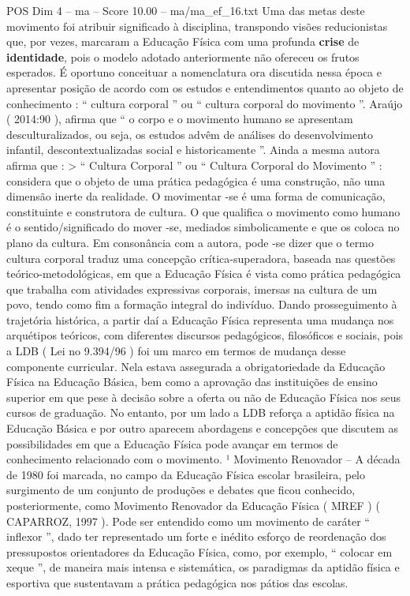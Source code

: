 \begin{textsample}{POS Dim 4 – ma – Score 10.00 – ma/ma\_ef\_16.txt}
Uma das metas deste movimento foi atribuir significado à disciplina, transpondo visões reducionistas que, por vezes, marcaram a Educação Física com uma profunda \textbf{crise} de \textbf{identidade}, pois o modelo adotado anteriormente não ofereceu os frutos esperados.
É oportuno conceituar a nomenclatura ora discutida nessa época e apresentar posição de acordo com os estudos e entendimentos quanto ao objeto de conhecimento : “ cultura corporal ” ou “ cultura corporal do movimento ”.
Araújo ( 2014:90 ), afirma que “ o corpo e o movimento humano se apresentam desculturalizados, ou seja, os estudos advêm de análises do desenvolvimento infantil, descontextualizadas social e historicamente ”.
Ainda a mesma autora afirma que : > “ Cultura Corporal ” ou “ Cultura Corporal do Movimento ” : considera que o objeto de uma prática pedagógica é uma construção, não uma dimensão inerte da realidade.
O movimentar -se é uma forma de comunicação, constituinte e construtora de cultura.
O que qualifica o movimento como humano é o sentido/significado do mover -se, mediados simbolicamente e que os coloca no plano da cultura.
Em consonância com a autora, pode -se dizer que o termo cultura corporal traduz uma concepção crítica-superadora, baseada nas questões teórico-metodológicas, em que a Educação Física é vista como prática pedagógica que trabalha com atividades expressivas corporais, imersas na cultura de um povo, tendo como fim a formação integral do indivíduo.
Dando prosseguimento à trajetória histórica, a partir daí a Educação Física representa uma mudança nos arquétipos teóricos, com diferentes discursos pedagógicos, filosóficos e sociais, pois a LDB ( Lei no 9.394/96 ) foi um marco em termos de mudança desse componente curricular.
Nela estava assegurada a obrigatoriedade da Educação Física na Educação Básica, bem como a aprovação das instituições de ensino superior em que pese à decisão sobre a oferta ou não de Educação Física nos seus cursos de graduação.
No entanto, por um lado a LDB reforça a aptidão física na Educação Básica e por outro aparecem abordagens e concepções que discutem as possibilidades em que a Educação Física pode avançar em termos de conhecimento relacionado com o movimento. ¹ Movimento Renovador – A década de 1980 foi marcada, no campo da Educação Física escolar brasileira, pelo surgimento de um conjunto de produções e debates que ficou conhecido, posteriormente, como Movimento Renovador da Educação Física ( MREF ) ( CAPARROZ, 1997 ).
Pode ser entendido como um movimento de caráter “ inflexor ”, dado ter representado um forte e inédito esforço de reordenação dos pressupostos orientadores da Educação Física, como, por exemplo, “ colocar em xeque ”, de maneira mais intensa e sistemática, os paradigmas da aptidão física e esportiva que sustentavam a prática pedagógica nos pátios das escolas.

\end{textsample}
